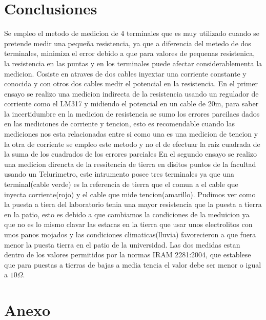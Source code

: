 \documentclass[12pt, letterpaper]{article}
\begin{document}
\section{Conclusiones}
Se empleo el metodo de medicion de 4 terminales que es muy utilizado cuando se pretende medir una pequeña resistencia, ya que a diferencia del metedo de dos terminales, minimiza el error debido a que para valores de pequenas resistenica, la resistencia en las puntas y en los terminales puede afectar considerablementa la medicion. Cosiste en atraves de dos cables inyextar una corriente constante y conocida y con otros dos cables medir el potencial en la resistencia.
\singlespacing
En el primer ensayo se realizo una medicion indirecta de la resistencia usando un regulador de corriente como el LM317 y midiendo el potencial en un cable de 20m, para saber la incertidumbre en la medicion de resistencia se sumo los errores parcilaes dados en las mediciones de corriente y tencion, esto es recomendable cuando las mediciones nos esta relacionadas entre si como una es una medicion de tencion y la otra de corriente se empleo este metodo y no el de efectuar la raíz cuadrada de la suma de los cuadrados de los errores parciales
\singlespacing
En el segundo ensayo se realizo una medicion direncta de la ressitencia de tierra en disitos puntos de la facultad usando un Telurimetro, este intrumento posee tres terminales ya que una terminal(cable verde) es la referencia de tierra que el comun a el cable que inyecta corriente(rojo) y el cable que mide tencion(amarillo). Pudimos ver como la puesta a tiera del laboratorio tenia una mayor resistencia que la puesta a tierra en la patio, esto es debido a que cambiamos la condiciones de la meduicion ya que no es lo mismo clavar las estacas en la tierra que usar unos electrolitos con unos panos mojados y las condiciones climaticas(lluvia) favorecieron a que fuera menor la puesta tierra en el patio de la universidad. Las dos medidas estan dentro de los valores permitidos por la normas IRAM 2281:2004, que establese que para puestas a tierras de bajas a media tencia el valor debe ser menor o igual a $10\Omega$.
\singlespacing

\newpage
\section{Anexo}
\end{document}
